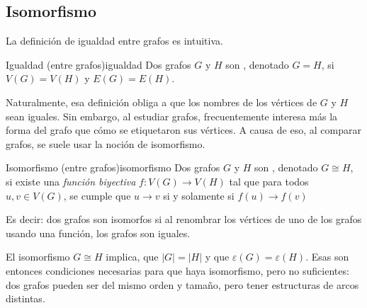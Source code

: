 \subsection{Isomorfismo}
\label{sec:comparacion_de_grafos}

La definición de igualdad entre grafos es intuitiva.
\begin{definicion}{Igualdad (entre grafos)}{igualdad}
  Dos grafos $G$ y $H$ son , denotado \(G=H\), si \(V(G)=V(H)\) y \(E(G)=E(H)\).
\end{definicion}
Naturalmente, esa definición obliga a que los nombres de los vértices de $G$ y $H$ sean iguales. Sin embargo, al estudiar grafos, frecuentemente interesa más la forma del grafo que cómo se etiquetaron sus vértices. A causa de eso, al comparar grafos, se suele usar la noción de isomorfismo.

\begin{definicion}{Isomorfismo (entre grafos)}{isomorfismo}
  Dos grafos $G$ y $H$ son , denotado \(G\cong H\), si existe una \emph{función biyectiva} \(f\colon V(G)\to V(H)\) tal que para todos \(u,v \in V(G)\), se cumple que \(u\longrightarrow v\) si y solamente si \(f(u) \longrightarrow f(v)\)
\end{definicion} 
Es decir: dos grafos son isomorfos si al renombrar los vértices de uno de los grafos usando una función, los grafos son iguales.

El isomorfismo \(G\cong H\) implica, que \(|G|=|H|\) y que \(\varepsilon(G) = \varepsilon(H)\). Esas son entonces condiciones necesarias para que haya isomorfismo, pero no suficientes: dos grafos pueden ser del mismo orden y tamaño, pero tener estructuras de arcos distintas.